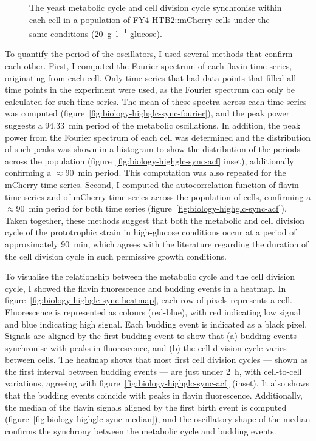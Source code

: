 \begin{figure}
  \caption{
    The yeast metabolic cycle and cell division cycle synchronise within each cell in a population of FY4 HTB2::mCherry cells under the same conditions (\SI{20}{\gram~\litre^{-1}} glucose).
  }
  \label{fig:biology-highglc-sync}
\end{figure}

To quantify the period of the oscillators, I used several methods that confirm each other.
First, I computed the Fourier spectrum of each flavin time series, originating from each cell.
Only time series that had data points that filled all time points in the experiment were used, as the Fourier spectrum can only be calculated for such time series.
The mean of these spectra across each time series was computed (figure~\ref{fig:biology-highglc-sync-fourier}), and the peak power suggests a \SI{94.33}{\minute} period of the metabolic oscillations.
In addition, the peak power from the Fourier spectrum of each cell was determined and the distribution of such peaks was shown in a histogram to show the distribution of the periods across the population (figure~\ref{fig:biology-highglc-sync-acf} inset), additionally confirming a $\approx$\SI{90}{\minute} period.
This computation was also repeated for the mCherry time series.
Second, I computed the autocorrelation function of flavin time series and of mCherry time series across the population of cells, confirming a $\approx$\SI{90}{\minute} period for both time series (figure~\ref{fig:biology-highglc-sync-acf}).
Taken together, these methods suggest that both the metabolic and cell division cycle of the prototrophic strain in high-glucose conditions occur at a period of approximately \SI{90}{\minute}, which agrees with the literature regarding the duration of the cell division cycle in such permissive growth conditions.

To visualise the relationship between the metabolic cycle and the cell division cycle, I showed the flavin fluorescence and budding events in a heatmap.
In figure~\ref{fig:biology-highglc-sync-heatmap},
each row of pixels represents a cell.
Fluorescence is represented as colours (red-blue), with red indicating low signal and blue indicating high signal.
Each budding event is indicated as a black pixel.
Signals are aligned by the first budding event to show that
(a) budding events synchronise with peaks in fluorescence, and
(b) the cell division cycle varies between cells.
The heatmap shows that most first cell division cycles --- shown as the first interval between budding events --- are just under \SI{2}{\hour}, with cell-to-cell variations, agreeing with figure~\ref{fig:biology-highglc-sync-acf} (inset).
It also shows that the budding events coincide with peaks in flavin fluorescence.
Additionally, the median of the flavin signals aligned by the first birth event is computed (figure~\ref{fig:biology-highglc-sync-median}), and the oscillatory shape of the median confirms the synchrony between the metabolic cycle and budding events.

